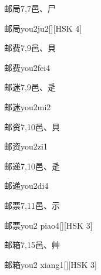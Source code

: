 \begin{entry}{邮局}{7,7}{⾢、⼫}
  \begin{phonetics}{邮局}{you2ju2}[][HSK 4]
  \end{phonetics}
\end{entry}

\begin{entry}{邮费}{7,9}{⾢、⾙}
  \begin{phonetics}{邮费}{you2fei4}
  \end{phonetics}
\end{entry}

\begin{entry}{邮迷}{7,9}{⾢、⾡}
  \begin{phonetics}{邮迷}{you2mi2}
  \end{phonetics}
\end{entry}

\begin{entry}{邮资}{7,10}{⾢、⾙}
  \begin{phonetics}{邮资}{you2zi1}
  \end{phonetics}
\end{entry}

\begin{entry}{邮递}{7,10}{⾢、⾡}
  \begin{phonetics}{邮递}{you2di4}
  \end{phonetics}
\end{entry}

\begin{entry}{邮票}{7,11}{⾢、⽰}
  \begin{phonetics}{邮票}{you2 piao4}[][HSK 3]
  \end{phonetics}
\end{entry}

\begin{entry}{邮箱}{7,15}{⾢、⾋}
  \begin{phonetics}{邮箱}{you2 xiang1}[][HSK 3]
  \end{phonetics}
\end{entry}

